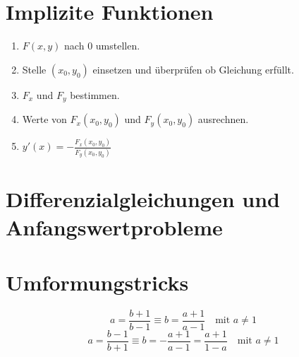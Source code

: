 \documentclass[main.tex]{subfiles}
\begin{document}
\section{Implizite Funktionen}
\begin{enumerate}
    \item $F(x, y)$ nach $0$ umstellen.
    \item Stelle $(x_0, y_0)$ einsetzen und überprüfen ob Gleichung erfüllt.
    \item $F_x$ und $F_y$ bestimmen.
    \item Werte von $F_x(x_0, y_0)$ und $F_y(x_0, y_0)$ ausrechnen.
    \item $y'(x) = - \frac{F_x(x_0, y_0)}{F_y(x_0, y_0)}$
\end{enumerate}


\section{Differenzialgleichungen und Anfangswertprobleme}



\section{Umformungstricks}
\[
	a = \frac{b+1}{b-1} \equiv
	b = \frac{a+1}{a-1}\quad \text{mit } a \neq 1
\]
\[
	a = \frac{b-1}{b+1} \equiv
	b = -\frac{a+1}{a-1} = \frac{a+1}{1-a} \quad \text{mit } a \neq 1
\]
\end{document}
